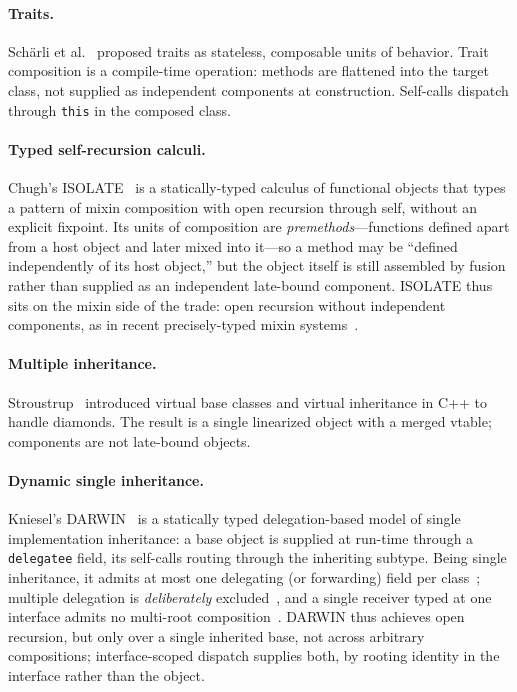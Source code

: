 \documentclass[sigplan,10pt,review,anonymous]{acmart}
\theoremstyle{acmplain}
\newcommand{\code}[1]{\texttt{#1}}
\begin{document}
\paragraph{Traits.}
Sch\"arli et al.~\cite{scharli2003} proposed traits as stateless, composable
units of behavior. Trait composition is a compile-time operation: methods are
flattened into the target class, not supplied as independent components at
construction. Self-calls dispatch through \code{this} in the composed class.

\paragraph{Typed self-recursion calculi.}
Chugh's ISOLATE~\cite{chugh2015} is a statically-typed calculus of functional
objects that types a pattern of mixin composition with open recursion through
self, without an explicit fixpoint. Its units of composition are
\emph{premethods}---functions defined apart from a host object and later mixed
into it---so a method may be ``defined independently of its host object,'' but
the object itself is still assembled by fusion rather than supplied as an
independent late-bound component. ISOLATE thus sits on the mixin side of the
trade: open recursion without independent components, as in recent
precisely-typed mixin systems~\cite{fanparreaux2023}.

\paragraph{Multiple inheritance.}
Stroustrup~\cite{stroustrup1987} introduced virtual base classes and virtual
inheritance in C++ to handle diamonds. The result is a single linearized object
with a merged vtable; components are not late-bound objects.

\paragraph{Dynamic single inheritance.}
Kniesel's DARWIN~\cite{kniesel1999,kniesel2000} is a statically typed
delegation-based model of single implementation inheritance: a base object is
supplied at run-time through a \code{delegatee} field, its self-calls routing
through the inheriting subtype. Being single inheritance, it admits at most one
delegating (or forwarding) field per class~\cite[\S6.5]{kniesel2000}; multiple
delegation is \emph{deliberately} excluded~\cite[\S6.5.1]{kniesel2000}, and a
single receiver typed at one interface admits no multi-root
composition~\cite[\S5.5.4]{kniesel2000}. DARWIN thus achieves open recursion,
but only over a single inherited base, not across arbitrary compositions;
interface-scoped dispatch supplies both, by rooting identity in the interface
rather than the object.
\end{document}

